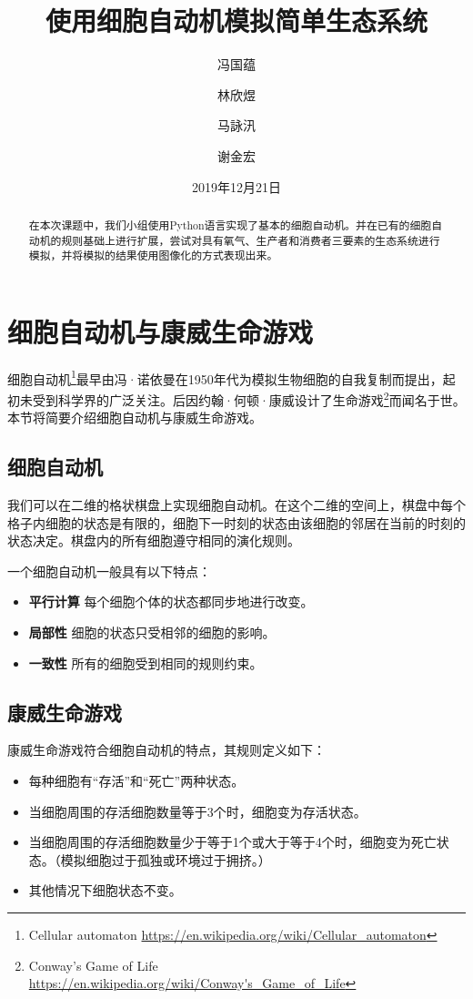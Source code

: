 \documentclass{ctexart}
\author{
	冯国蕴 \and 林欣煜 \and 马詠汛 \and 谢金宏
}
\title{使用细胞自动机模拟简单生态系统}
\date{2019年12月21日}
\begin{document}
\maketitle

\begin{abstract}
在本次课题中，我们小组使用Python语言实现了基本的细胞自动机。并在已有的细胞自动机的规则基础上进行扩展，尝试对具有氧气、生产者和消费者三要素的生态系统进行模拟，并将模拟的结果使用图像化的方式表现出来。
\end{abstract}

\tableofcontents

\section{细胞自动机与康威生命游戏}

细胞自动机\footnote{Cellular automaton \url{https://en.wikipedia.org/wiki/Cellular_automaton}}最早由冯·诺依曼在1950年代为模拟生物细胞的自我复制而提出，起初未受到科学界的广泛关注。后因约翰·何顿·康威设计了生命游戏\footnote{Conway's Game of Life \url{https://en.wikipedia.org/wiki/Conway's_Game_of_Life}}而闻名于世。本节将简要介绍细胞自动机与康威生命游戏。

\subsection{细胞自动机}

我们可以在二维的格状棋盘上实现细胞自动机。在这个二维的空间上，棋盘中每个格子内细胞的状态是有限的，细胞下一时刻的状态由该细胞的邻居在当前的时刻的状态决定。棋盘内的所有细胞遵守相同的演化规则。

一个细胞自动机一般具有以下特点：

\begin{itemize}
  \item \textbf{平行计算 }每个细胞个体的状态都同步地进行改变。
  \item \textbf{局部性 }细胞的状态只受相邻的细胞的影响。
  \item \textbf{一致性 }所有的细胞受到相同的规则约束。
\end{itemize}

\subsection{康威生命游戏}

康威生命游戏符合细胞自动机的特点，其规则定义如下：

\begin{itemize}
  \item 每种细胞有“存活”和“死亡”两种状态。
  \item 当细胞周围的存活细胞数量等于3个时，细胞变为存活状态。
  \item 当细胞周围的存活细胞数量少于等于1个或大于等于4个时，细胞变为死亡状态。（模拟细胞过于孤独或环境过于拥挤。）
  \item 其他情况下细胞状态不变。
\end{itemize}
\end{document}
